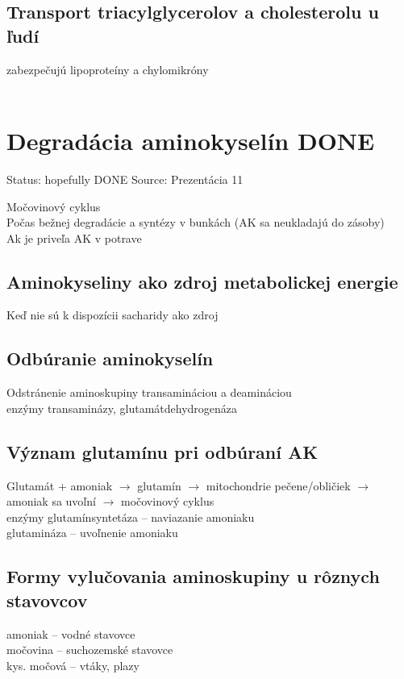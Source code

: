 \subsection{Transport triacylglycerolov a cholesterolu u ľudí}
zabezpečujú lipoproteíny a chylomikróny\\
\\

\section{Degradácia aminokyselín DONE}

Status: hopefully DONE
Source: Prezentácia 11

Močovinový cyklus\\
Počas bežnej degradácie a syntézy v bunkách (AK sa neukladajú do zásoby)\\
Ak je priveľa AK v potrave\\
\subsection{Aminokyseliny ako zdroj metabolickej energie}
Keď nie sú k dispozícii sacharidy ako zdroj\\
\subsection{Odbúranie aminokyselín}
Odstránenie aminoskupiny transamináciou a deamináciou\\
enzýmy transaminázy, glutamátdehydrogenáza\\
\subsection{Význam glutamínu pri odbúraní AK}
Glutamát + amoniak $\rightarrow$ glutamín $\rightarrow$ mitochondrie pečene/obličiek $\rightarrow$ amoniak sa uvoľní $\rightarrow$ močovinový cyklus\\
enzýmy glutamínsyntetáza -- naviazanie amoniaku\\
glutamináza -- uvoľnenie amoniaku\\
\subsection{Formy vylučovania aminoskupiny u rôznych stavovcov}
amoniak -- vodné stavovce\\
močovina -- suchozemské stavovce\\
kys. močová -- vtáky, plazy\\

